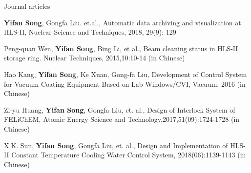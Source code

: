 

\begin{cventries}

  \cventry
    {Journal articles} %
    {} %
    {} %
    {} %
    {
      \begin{cvitems} %
        \item {\textbf{Yifan Song}, Gongfa Liu. et.al., Automatic data archiving and visualization at HLS-II, Nuclear Science and Techniques, 2018, 29(9): 129}
       \item {Peng-quan Wen, \textbf{Yifan Song}, Bing Li, et al., Beam cleaning status in HLS-II storage ring. Nuclear Techniques, 2015,10:10-14 (in Chinese)}
       \item {Hao Kang, \textbf{Yifan Song}, Ke Xuan, Gong-fa Liu, Development of Control System for Vacuum Coating Equipment Based on Lab Windows/CVI, Vacuum, 2016 (in Chinese)}
       \item {Zi-yu Huang, \textbf{Yifan Song}, Gongfa Liu, et. al., Design of Interlock System of FELiChEM, Atomic Energy Science and Technology,2017,51(09):1724-1728 (in Chinese)}
       \item{X.K. Sun, \textbf{Yifan Song}, Gongfa Liu, et. al., Design and Implementation of HLS-II Constant Temperature Cooling Water Control System, 2018(06):1139-1143 (in Chinese)}
      \end{cvitems}
    }


\end{cventries}
